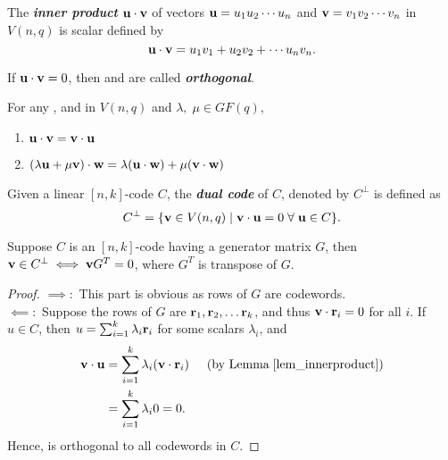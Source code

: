 \documentclass[../main.tex]{subfiles}
\begin{document}
	
\begin{defn}
	The \textbf{\emph{inner product}} $\textbf{u}\cdot \textbf{v}$ of vectors $\textbf{u}=u_1u_2\cdots u_n$ and $\textbf{v}=v_1v_2\cdots v_n$ in $V(n,q)$ is scalar defined by
	\[
		\textbf{u}\cdot \textbf{v} = u_1v_1 + u_2v_2+\cdots u_nv_n.
	\]
\end{defn}	
If $\textbf{u}\cdot \textbf{v}=0$, then  and  are called \textbf{\emph{orthogonal}}.\\

\begin{lem}\label{lem_innerproduct}
	For any ,  and  in $V(n,q)$ and $\lambda,\; \mu \in GF(q)$, 
	\begin{enumerate}
	\itemsep-1mm
		\item $\textbf{u}\cdot \textbf{v} = \textbf{v} \cdot \textbf{u}$
		\item $(\lambda \textbf{u}+\mu \textbf{v})\cdot \textbf{w} = \lambda(\textbf{u}\cdot \textbf{w})+ \mu(\textbf{v}\cdot \textbf{w})$
	\end{enumerate}
\end{lem}

\begin{defn}
	Given a linear $[n,k]$-code $C$, the \textbf{\emph{dual code}} of $C$, denoted by $C^{\perp}$ is defined as
	\[
		C^{\perp} = \{\textbf{v}\in V(n,q) \;|\; \textbf{v}\cdot \textbf{u}=0 \;\forall\; \textbf{u} \in C\}.
	\]
\end{defn}

\begin{lem}\label{lem_dual-necessary}
	Suppose $C$ is an $[n,k]$-code having a generator matrix $G$, then $\textbf{v}\in C^{\perp} \iff \textbf{v}G^T=0$, where $G^T$ is transpose of $G$.
\end{lem}
\begin{proof}
	$\implies :$ This part is obvious as rows of $G$ are codewords.\\
	$\impliedby :$ Suppose the rows of $G$ are $\textbf{r}_1,\textbf{r}_2,\ldots \textbf{r}_k$, and thus $\textbf{v}\cdot \textbf{r}_i=0$ for all $i$. If $u\in C$, then $u=\sum_{i=1}^{k}\lambda_i\textbf{r}_i$ for some scalars $\lambda_i$, and
	\begin{align*}
		\textbf{v}\cdot \textbf{u} &=\displaystyle\sum_{i=1}^{k}\lambda_i(\textbf{v}\cdot \textbf{r}_i)\hspace{5mm} (\text{by Lemma}\; \ref{lem_innerproduct})\\
		&=\displaystyle\sum_{i=1}^k\lambda_i0=0.
	\end{align*}
	Hence,  is orthogonal to all codewords in $C$.
\end{proof}
\end{document}
